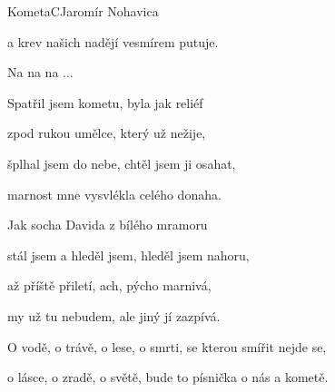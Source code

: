 \begin{song}{Kometa}{C}{Jaromír Nohavica}
\begin{SBVerse}
a krev našich nadějí vesmírem putuje.

\end{SBVerse}

\begin{SBChorus}

Na na na ...

\end{SBChorus}

\begin{SBVerse}

Spatřil jsem kometu, byla jak reliéf

zpod rukou umělce, který už nežije,

šplhal jsem do nebe, chtěl jsem ji osahat,

marnost mne vysvlékla celého donaha.

\end{SBVerse}

\begin{SBVerse}

Jak socha Davida z bílého mramoru

stál jsem a hleděl jsem, hleděl jsem nahoru,

až příště přiletí, ach, pýcho marnivá,

my už tu nebudem, ale jiný jí zazpívá.

\end{SBVerse}

\begin{SBChorus}

O vodě, o trávě, o lese, o smrti, se kterou smířit nejde se,

o lásce, o zradě, o světě, bude to písnička o nás a kometě.

\end{SBChorus}

\end{song}

\pagebreak
